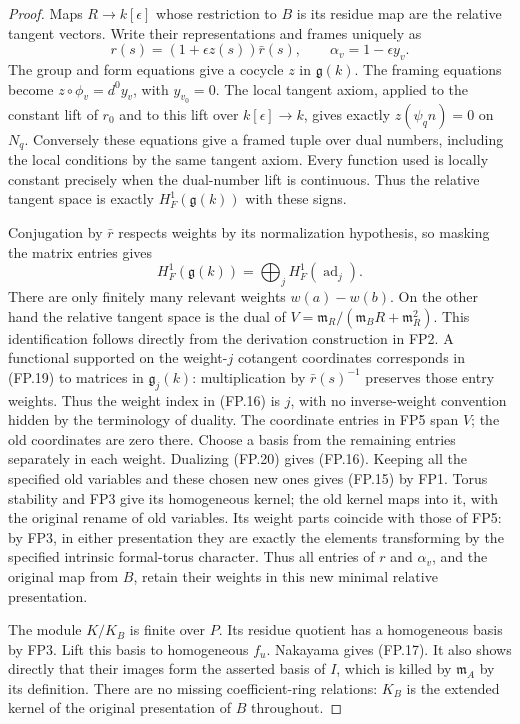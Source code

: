 \begin{proof}
Maps $R\to k[\epsilon]$ whose restriction to $B$ is its residue
map are the relative tangent vectors.
Write their representations and frames uniquely as
\[
 r(s)=(1+\epsilon z(s))\bar r(s),\qquad
                   \alpha_v=1-\epsilon y_v .
 \tag{FP.19}
\]
The group and form equations give a cocycle $z$ in
$\mathfrak g(k)$.
The framing equations become $z\circ\phi_v=d^0y_v$, with
$y_{v_0}=0$.
The local tangent axiom, applied to the constant lift of $r_0$
and to this lift over $k[\epsilon]\to k$, gives exactly
$z(\psi_qn)=0$ on $N_q$.
Conversely these equations give a framed tuple over dual numbers,
including the local conditions by the same tangent axiom.
Every function used is locally constant precisely when the
dual-number lift is continuous.
Thus the relative tangent space is exactly
$H^1_F(\mathfrak g(k))$ with these signs.

Conjugation by $\bar r$ respects weights by its normalization
hypothesis, so masking the matrix entries gives
\[
 H^1_F(\mathfrak g(k))
                 =\bigoplus_jH^1_F(\operatorname{ad}_j).
 \tag{FP.20}
\]
There are only finitely many relevant weights $w(a)-w(b)$.
On the other hand the relative tangent space is the dual of
$V=\mathfrak m_R/(\mathfrak m_BR+\mathfrak m_R^2)$.
This identification follows directly from the derivation
construction in FP2.
A functional supported on the weight-$j$ cotangent coordinates
corresponds in (FP.19) to matrices in $\mathfrak g_j(k)$:
multiplication by $\bar r(s)^{-1}$ preserves those entry weights.
Thus the weight index in (FP.16) is $j$, with no inverse-weight
convention hidden by the terminology of duality.
The coordinate entries in FP5 span $V$; the old coordinates are
zero there.  Choose a basis from the remaining entries separately
in each weight.  Dualizing (FP.20) gives (FP.16).
Keeping all the specified old variables and these chosen new ones
gives (FP.15) by FP1.
Torus stability and FP3 give its homogeneous kernel; the old
kernel maps into it, with the original rename of old variables.
Its weight parts coincide with those of FP5: by FP3, in either
presentation they are exactly the elements transforming by the
specified intrinsic formal-torus character.  Thus all entries
of $r$ and $\alpha_v$, and the original map from $B$, retain
their weights in this new minimal relative presentation.

The module $K/K_B$ is finite over $P$.
Its residue quotient has a homogeneous basis by FP3.
Lift this basis to homogeneous $f_u$.
Nakayama gives (FP.17).  It also shows directly that their images
form the asserted basis of $I$, which is killed by
$\mathfrak m_A$ by its definition.
There are no missing coefficient-ring relations: $K_B$ is the
extended kernel of the original presentation of $B$ throughout.


\end{proof}
